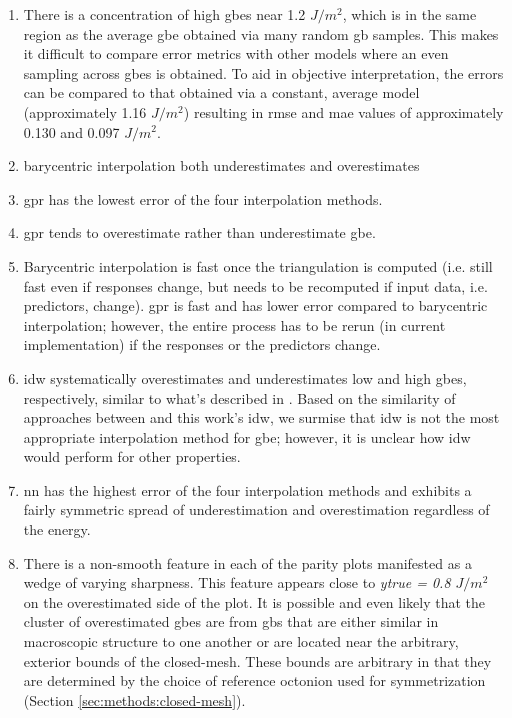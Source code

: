 \documentclass[preprint,12pt]{elsarticle}
\begin{document}
\begin{enumerate}
    \item There is a concentration of high \glspl{gbe} near 1.2 $J/m^2$, which is in the same region as the average \gls{gbe} obtained via many random \gls{gb} samples. This makes it difficult to compare error metrics with other models where an even sampling across \glspl{gbe} is obtained. To aid in objective interpretation, the errors can be compared to that obtained via a constant, average model (approximately 1.16 $J/m^2$) resulting in \gls{rmse} and \gls{mae} values of approximately 0.130 and 0.097 $J/m^2$.
    \item barycentric interpolation both underestimates and overestimates
    \item \Gls{gpr} has the lowest error of the four interpolation methods.
    \item \Gls{gpr} tends to overestimate rather than underestimate \gls{gbe}.
    \item Barycentric interpolation is fast once the triangulation is computed (i.e. still fast even if responses change, but needs to be recomputed if input data, i.e. predictors, change). \Gls{gpr} is fast and has lower error compared to barycentric interpolation; however, the entire process has to be rerun (in current implementation) if the responses or the predictors change.
    \item \Gls{idw} systematically overestimates and underestimates low and high \glspl{gbe}, respectively, similar to what's described in \cite{chesserLearningGrainBoundary2020}. Based on the similarity of approaches between \cite{chesserLearningGrainBoundary2020} and this work's \gls{idw}, we surmise that \gls{idw} is not the most appropriate interpolation method for \gls{gbe}; however, it is unclear how \gls{idw} would perform for other properties.
    \item \Gls{nn} has the highest error of the four interpolation methods and exhibits a fairly symmetric spread of underestimation and overestimation regardless of the energy.
    \item There is a non-smooth feature in each of the parity plots manifested as a wedge of varying sharpness. This feature appears close to \textit{ytrue = 0.8 $J/m^2$} on the overestimated side of the plot. It is possible and even likely that the cluster of overestimated \glspl{gbe} are from \glspl{gb} that are either similar in macroscopic structure to one another or are located near the arbitrary, exterior bounds of the closed-mesh. These bounds are arbitrary in that they are determined by the choice of reference octonion used for symmetrization (Section \ref{sec:methods:closed-mesh}).
\end{enumerate}
\end{document}

